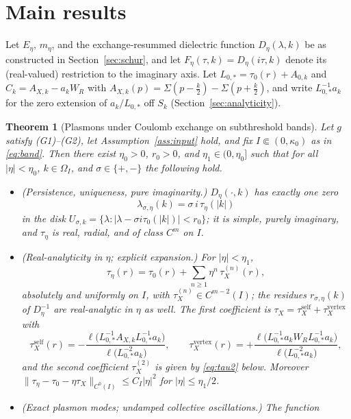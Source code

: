 \documentclass[11pt,a4paper]{amsart}
\newtheorem{theorem}{Theorem}[section]
\theoremstyle{definition}
\theoremstyle{remark}
\newcommand{\ellf}{\ell}
\begin{document}
\section{Main results}\label{sec:main}

Let $E_\eta$, $m_\eta$, and the exchange-resummed dielectric function $D_\eta(\lambda,k)$ be as constructed in Section~\ref{sec:schur}, and let $F_\eta(\tau,k)=D_\eta(i\tau,k)$ denote its (real-valued) restriction to the imaginary axis. Let $L_{0,*}=\tau_0(r)+A_{0,k}$ and $C_k=A_{X,k}-a_kW_R$ with $A_{X,k}(p)=\Sigma(p-\frac k2)-\Sigma(p+\frac k2)$, and write $L_{0,*}^{-1}a_k$ for the zero extension of $a_k/L_{0,*}$ off $S_k$ (Section~\ref{sec:analyticity}).

\begin{theorem}[Plasmons under Coulomb exchange on subthreshold bands]\label{thm:main}
Let $g$ satisfy \textup{(G1)--(G2)}, let Assumption~\textup{\ref{ass:input}} hold, and fix $I\Subset(0,\kappa_0)$ as in \eqref{eq:band}. Then there exist $\eta_0>0$, $r_0>0$, and $\eta_1\in(0,\eta_0]$ such that for all $|\eta|<\eta_0$, $k\in\Omega_I$, and $\sigma\in\{+,-\}$ the following hold.
\begin{itemize}
\item[(i)] \textup{(Persistence, uniqueness, pure imaginarity.)} $D_\eta(\cdot,k)$ has exactly one zero
\[
\lambda_{\sigma,\eta}(k)=\sigma\, i\,\tau_\eta(|k|)
\]
in the disk $U_{\sigma,k}=\{\lambda:|\lambda-\sigma i\tau_0(|k|)|<r_0\}$; it is simple, purely imaginary, and $\tau_\eta$ is real, radial, and of class $C^m$ on $I$.
\item[(ii)] \textup{(Real-analyticity in $\eta$; explicit expansion.)} For $|\eta|<\eta_1$,
\[
\tau_\eta(r)=\tau_0(r)+\sum_{n\ge1}\eta^n\,\tau_X^{(n)}(r),
\]
absolutely and uniformly on $I$, with $\tau_X^{(n)}\in C^{m-2}(I)$; the residues $r_{\sigma,\eta}(k)$ of $D_\eta^{-1}$ are real-analytic in $\eta$ as well. The first coefficient is $\tau_X=\tau_X^{\mathrm{self}}+\tau_X^{\mathrm{vertex}}$ with
\begin{equation}\label{eq:tauXsplit}
\tau_X^{\mathrm{self}}(r)=-\frac{\ellf\bigl(L_{0,*}^{-1}A_{X,k}L_{0,*}^{-1}a_k\bigr)}{\ellf\bigl(L_{0,*}^{-2}a_k\bigr)},
\qquad
\tau_X^{\mathrm{vertex}}(r)=+\frac{\ellf\bigl(L_{0,*}^{-1}a_kW_RL_{0,*}^{-1}a_k\bigr)}{\ellf\bigl(L_{0,*}^{-2}a_k\bigr)},
\end{equation}
and the second coefficient $\tau_X^{(2)}$ is given by \eqref{eq:tau2} below. Moreover
$\|\tau_\eta-\tau_0-\eta\tau_X\|_{C^0(I)}\le C_I|\eta|^2$ for $|\eta|\le\eta_1/2$.
\item[(iii)] \textup{(Exact plasmon modes; undamped collective oscillations.)} The function

\end{itemize}
\end{theorem}
\end{document}
